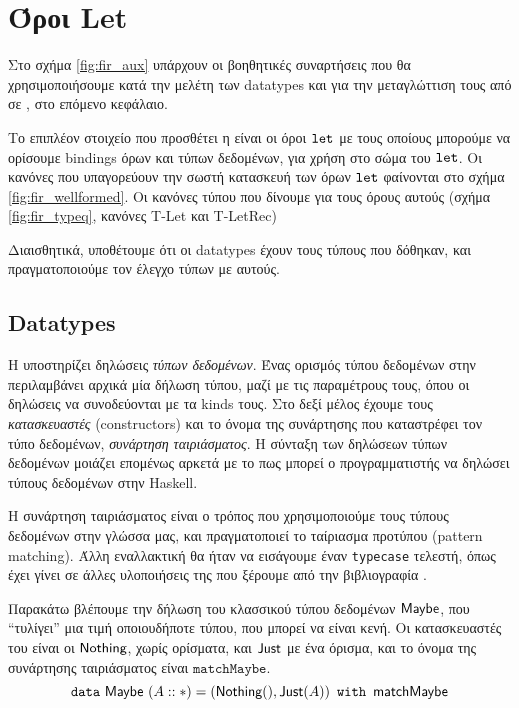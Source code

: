 \section{Όροι Let} \label{sec:fir}

Στο σχήμα \ref{fig:fir_aux} υπάρχουν οι βοηθητικές συναρτήσεις που θα
χρησιμοποιήσουμε κατά την μελέτη των datatypes και για την μεταγλώττιση τους
από \FIR{} σε \FOMF{}, στο επόμενο κεφάλαιο.

Το επιπλέον στοιχείο που προσθέτει η \FIR{} είναι οι όροι $\tlet$ με τους
οποίους μπορούμε να ορίσουμε bindings όρων και τύπων δεδομένων, για χρήση στο
σώμα του $\tlet$. Οι κανόνες που υπαγορεύουν την σωστή κατασκευή των όρων
$\tlet$ φαίνονται στο σχήμα \ref{fig:fir_wellformed}.  Οι κανόνες τύπου που
δίνουμε για τους όρους αυτούς (σχήμα \ref{fig:fir_typeq}, κανόνες T-Let και
T-LetRec)

Διαισθητικά, υποθέτουμε ότι οι datatypes έχουν τους τύπους που δόθηκαν, και
πραγματοποιούμε τον έλεγχο τύπων με αυτούς.


\subsection{Datatypes}

Η \FIR{} υποστηρίζει δηλώσεις \emph{τύπων δεδομένων}. Ένας ορισμός τύπου
δεδομένων στην \FIR{} περιλαμβάνει αρχικά μία δήλωση τύπου, μαζί με τις
παραμέτρους τους, όπου οι δηλώσεις να συνοδεύονται με τα kinds τους. Στο δεξί
μέλος έχουμε τους \emph{κατασκευαστές} (constructors) και το όνομα της
συνάρτησης που καταστρέφει τον τύπο δεδομένων, \emph{συνάρτηση ταιριάσματος}. Η
σύνταξη των δηλώσεων τύπων δεδομένων μοιάζει επομένως αρκετά με το πως μπορεί ο
προγραμματιστής να δηλώσει τύπους δεδομένων στην Haskell.

Η συνάρτηση ταιριάσματος είναι ο τρόπος που χρησιμοποιούμε τους τύπους
δεδομένων στην γλώσσα μας, και πραγματοποιεί το ταίριασμα προτύπου (pattern
matching). Άλλη εναλλακτική θα ήταν να εισάγουμε έναν \texttt{typecase}
τελεστή, όπως έχει γίνει σε άλλες υλοποιήσεις της \FOMF{} που ξέρουμε από την
βιβλιογραφία \cite{cai}.

Παρακάτω βλέπουμε την δήλωση του κλασσικού τύπου δεδομένων $\Maybe$, που
``τυλίγει'' μια τιμή οποιουδήποτε τύπου, που μπορεί να είναι κενή. Οι
κατασκευαστές του είναι οι $\Nothing$, χωρίς ορίσματα, και  $\Just$ με ένα
όρισμα, και το όνομα της συνάρτησης ταιριάσματος είναι $\texttt{matchMaybe}$.
\begin{displaymath} \datatype{\Maybe}{(A ::
\Type)}{\textsf{matchMaybe}}{(\Nothing (), \Just (A))} \end{displaymath}

